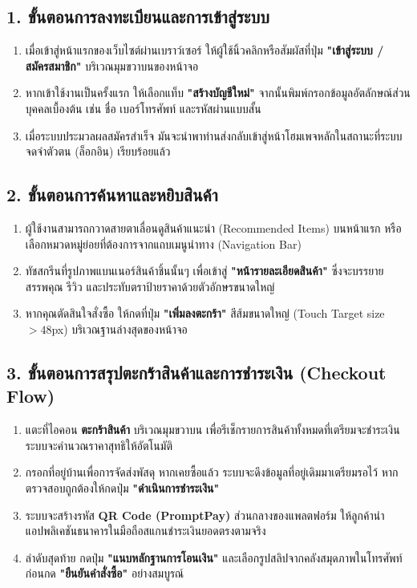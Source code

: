 \subsection{1. ขั้นตอนการลงทะเบียนและการเข้าสู่ระบบ}
\begin{enumerate}
    \item เมื่อเข้าสู่หน้าแรกของเว็บไซต์ผ่านเบราว์เซอร์ ให้ผู้ใช้นิ้วคลิกหรือสัมผัสที่ปุ่ม \textbf{"เข้าสู่ระบบ / สมัครสมาชิก"} บริเวณมุมขวาบนของหน้าจอ
    \item หากเข้าใช้งานเป็นครั้งแรก ให้เลือกแท็บ \textbf{"สร้างบัญชีใหม่"} จากนั้นพิมพ์กรอกข้อมูลอัตลักษณ์ส่วนบุคคลเบื้องต้น เช่น ชื่อ เบอร์โทรศัพท์ และรหัสผ่านแบบสั้น
    \item เมื่อระบบประมวลผลสมัครสำเร็จ มันจะนำพาท่านส่งกลับเข้าสู่หน้าโฮมเพจหลักในสถานะที่ระบบจดจำตัวตน (ล็อกอิน) เรียบร้อยแล้ว
\end{enumerate}

\subsection{2. ขั้นตอนการค้นหาและหยิบสินค้า}
\begin{enumerate}
    \item ผู้ใช้งานสามารถกวาดสายตาเลื่อนดูสินค้าแนะนำ (Recommended Items) บนหน้าแรก หรือเลือกหมวดหมู่ย่อยที่ต้องการจากแถบเมนูนำทาง (Navigation Bar)
    \item ทัชสกรีนที่รูปภาพแบนเนอร์สินค้าชิ้นนั้นๆ เพื่อเข้าสู่ \textbf{"หน้ารายละเอียดสินค้า"} ซึ่งจะบรรยายสรรพคุณ รีวิว และประทับตราป้ายราคาด้วยตัวอักษรขนาดใหญ่
    \item หากคุณตัดสินใจสั่งซื้อ ให้กดที่ปุ่ม \textbf{"เพิ่มลงตะกร้า"} สีส้มขนาดใหญ่ (Touch Target size $> 48$px) บริเวณฐานล่างสุดของหน้าจอ
\end{enumerate}

\subsection{3. ขั้นตอนการสรุปตะกร้าสินค้าและการชำระเงิน (Checkout Flow)}
\begin{enumerate}
    \item แตะที่ไอคอน \textbf{ตะกร้าสินค้า} บริเวณมุมขวาบน เพื่อรีเช็กรายการสินค้าทั้งหมดที่เตรียมจะชำระเงิน ระบบจะคำนวณราคาสุทธิให้อัตโนมัติ
    \item กรอกที่อยู่บ้านเพื่อการจัดส่งพัสดุ หากเคยซื้อแล้ว ระบบจะดึงข้อมูลที่อยู่เดิมมาเตรียมรอไว้ หากตรวจสอบถูกต้องให้กดปุ่ม \textbf{"ดำเนินการชำระเงิน"}
    \item ระบบจะสร้างรหัส \textbf{QR Code (PromptPay)} ส่วนกลางของแพลตฟอร์ม ให้ลูกค้านำแอปพลิเคชันธนาคารในมือถือสแกนชำระเงินยอดตรงตามจริง
    \item ลำดับสุดท้าย กดปุ่ม \textbf{"แนบหลักฐานการโอนเงิน"} และเลือกรูปสลิปจากคลังสมุดภาพในโทรศัพท์ ก่อนกด \textbf{"ยืนยันคำสั่งซื้อ"} อย่างสมบูรณ์
\end{enumerate}

